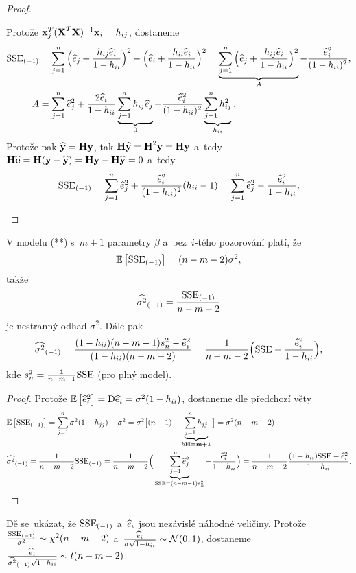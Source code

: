 \begin{theorem}
\begin{proof}
\begin{enumerate}[1)]
		Protože $\textbf{x}_j^T(\textbf{X}^T\textbf{X})^{-1} \textbf{x}_i=h_{ij}$, dostaneme
		\[
	\begin{split}
	{\mathrm{SSE}_{(-1)}}&=\sum\limits_{j=1}^{n} \Big(\widehat{e}_j+\frac{h_{ij}\widehat{e}_i}{1-h_{ii}}\Big)^2-\Big(\widehat{e}_i+\frac{h_{ii}\widehat{e}_i}{1-h_{ii}}\Big)^2=\underbrace{\sum\limits_{j=1}^{n}\Big(\widehat{e}_j+\frac{h_{ij}\widehat{e}_i}{1-h_{ii}}\Big)^2}_{A}-\frac{\widehat{e}_i^2}{(1-h_{ii})^2},\\
	A&= \sum\limits_{j=1}^{n} \widehat{e}_j^2+\frac{2\widehat{e}_i}{1-h_{ii}}\underbrace{\sum\limits_{j=1}^{n} h_{ij}\widehat{e}_j}_{0}+\frac{\widehat{e}_i^2}{(1-h_{ii})^2}\underbrace{\sum\limits_{j=1}^{n} h_{ij}^2}_{h_{ii}}.
	\end{split}
	\]
		Protože pak $\widehat{\textbf{y}}=\textbf{H}\textbf{y}$, tak $\textbf{H}\widehat{\textbf{y}}=\textbf{H}^2\textbf{y}=\textbf{H}\textbf{y}$ a~tedy $\textbf{H}\widehat{\textbf{e}}=\textbf{H}(\textbf{y}-\widehat{\textbf{y}})=\textbf{H}\textbf{y}-\textbf{H}\widehat{\textbf{y}}=0$ a~tedy 
		$$ {\mathrm{SSE}_{(-1)}}=\sum\limits_{j=1}^{n}\widehat{e}_j^2+\frac{\widehat{e}_i^2}{(1-h_{ii})^2}(h_{ii}-1)=\sum\limits_{j=1}^{n}\widehat{e}_j^2-\frac{\widehat{e}_i^2}{1-h_{ii}}.$$
	\end{enumerate}
\end{proof}
\end{theorem}
\begin{dusl}
	V modelu (**) s~$m+1$ parametry $\beta$ a~bez~$i$-tého pozorování platí, že $$\mathbb{E}\left[ {\mathrm{SSE}_{(-1)}} \right]=(n-m-2)\sigma^2,$$
	takže 
	$$ {\widehat{{\sigma}^2}_{(-1)}}=\frac{{\mathrm{SSE}_{(-1)}}}{n-m-2}$$ je nestranný odhad $\sigma^2$. Dále pak 
	$$ {\widehat{{\sigma}^2}_{(-1)}}=\frac{(1-h_{ii})(n-m-1)s_n^2-\widehat{e}_i^2}{(1-h_{ii})(n-m-2)}=\frac{1}{n-m-2}\Big(\mathrm{SSE} -\frac{\widehat{e}_i^2}{1-h_{ii}}\Big),$$ kde $s_n^2=\frac{1}{n-m-1}\mathrm{SSE}$ (pro plný model).
	\begin{proof}
		Protože $\mathbb{E}\left[ \widehat{e}_i^2 \right]=\mathrm{D} \widehat{e}_i=\sigma^2(1-h_{ii})$, dostaneme dle předchozí věty 
		\[
		\begin{split}
		&\mathbb{E}\left[ {\mathrm{SSE}_{(-1)}} \right]=\sum\limits_{j=1}^{n}\sigma^2(1-h_{jj})-\sigma^2=\sigma^2\big[(n-1)-\underbrace{\sum\limits_{j=1}^{n} h_{jj}}_{h\textbf{H=m+1}}\big]=\sigma^2(n-m-2)\\
		&{\widehat{{\sigma}^2}_{(-1)}}=\frac{1}{n-m-2}{\mathrm{SSE}_{(-1)}}=\frac{1}{n-m-2}\Big(\underbrace{\sum\limits_{j=1}^{n}\widehat{e}_j^2}_{\mathrm{SSE}=(n-m-1)s_n^2}-\frac{\widehat{e}_i^2}{1-h_{ii}}\Big)=\frac{1}{n-m-2}\frac{(1-h_{ii})\mathrm{SSE}-\widehat{e}_i^2}{1-h_{ii}}.
		\end{split}
		\]
	\end{proof}
\end{dusl}
\begin{remark}
	Dě se~ukázat, že ${\mathrm{SSE}_{(-1)}}$ a~$\widehat{e}_i$ jsou nezávislé náhodné veličiny. Protože $\frac{{\mathrm{SSE}_{(-1)}}}{\sigma^2}\sim\chi^2(n-m-2)$ a~$\frac{\widehat{e}_i}{\sigma\sqrt{1-h_{ii}}}\sim\mathcal{N}(0,1)$, dostaneme $\frac{\widehat{e}_i}{{\widehat{{\sigma}^2}_{(-1)}}\sqrt{1-h_{ii}}}\sim t(n-m-2)$.
\end{remark}
